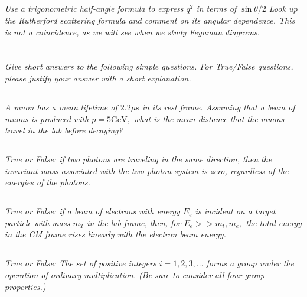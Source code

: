 \documentclass{article}
\begin{document}
\subsection{}
\textit{Use a trigonometric half-angle formula to express $q^{2}$ in terms of $\sin \theta / 2$ Look up the Rutherford scattering formula and comment on its angular dependence. This is not a coincidence, as we will see when we study Feynman diagrams.}


\newpage


\section{}
\textit{Give short answers to the following simple questions. For True/False questions, please justify your answer with a short explanation.}



\subsection{}
\textit{ A muon has a mean lifetime of $2.2 \mu \mathrm{s}$ in its rest frame. Assuming that a beam of muons is produced with $p=5 \mathrm{GeV},$ what is the mean distance that the muons travel in the lab before decaying?}

\subsection{}
\textit{True or False: if two photons are traveling in the same direction, then the invariant mass associated with the two-photon system is zero, regardless of the energies of the photons.}

\subsection{}
\textit{True or False: if a beam of electrons with energy $E_{e}$ is incident on a target particle with mass $m_{T}$ in the lab frame, then, for $E_{e}>>m_{t}, m_{e},$ the total energy in the CM frame rises linearly with the electron beam energy.}


\subsection{}
\textit{ True or False: The set of positive integers $i=1,2,3, \ldots$ forms a group under the operation of ordinary multiplication. (Be sure to consider all four group properties.)}
\end{document}
